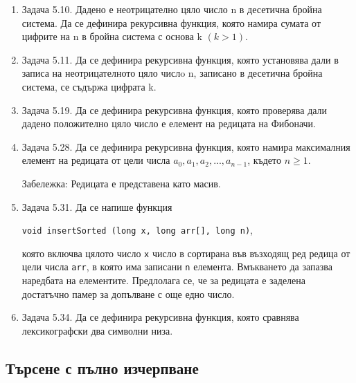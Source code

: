 {\begin{enumerate}
	\item Задача 5.10.\cite{sbornik} Дадено е неотрицателно цяло число n в десетична бройна система. Да се дефинира рекурсивна функция, която намира сумата от цифрите на n в бройна система с основа k $(k > 1)$.

	\item Задача 5.11.\cite{sbornik} Да се дефинира рекурсивна функция, която установява дали в записа на неотрицателното цяло числo n, записано в десетична бройна система, се съдържа цифрата k.

	\item Задача 5.19.\cite{sbornik} Да се дефинира рекурсивна функция, която проверява дали дадено положително цяло число е елемент на редицата на Фибоначи.

	\item Задача 5.28.\cite{sbornik} Да се дефинира рекурсивна функция, която намира максималния елемент на редицата от цели числа $a_0, a_1, a_2, ..., a_{n-1}$, където $n \ge 1$.

	Забележка: Редицата е представена като масив.

	\item Задача 5.31.\cite{sbornik} Да се напише функция

	\texttt{void insertSorted (long x, long arr[], long n)},

	която включва цялото число \texttt{x} число в сортирана във възходящ ред редица от цели числа \texttt{arr}, в която има записани \texttt{n} елемента. Вмъкването да запазва наредбата на елементите. Предлолага се, че за редицата е заделена достатъчно памер за допълване с още едно число.

	\item Задача 5.34.\cite{sbornik} Да се дефинира рекурсивна функция, която сравнява лексикографски два символни низа.
\end{enumerate}

\subsection{Търсене с пълно изчерпване}


}
